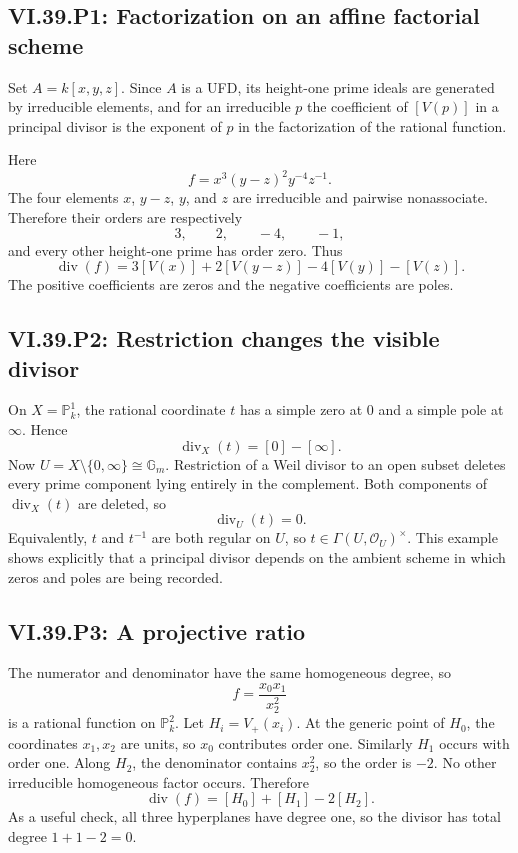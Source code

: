 
\subsection*{VI.39.P1: Factorization on an affine factorial scheme}
\begin{solution}
Set \(A=k[x,y,z]\).  Since \(A\) is a UFD, its height-one prime ideals are generated by irreducible elements, and for an irreducible \(p\) the coefficient of \([V(p)]\) in a principal divisor is the exponent of \(p\) in the factorization of the rational function.

Here
\[
 f=x^3(y-z)^2y^{-4}z^{-1}.
\]
The four elements \(x\), \(y-z\), \(y\), and \(z\) are irreducible and pairwise nonassociate.  Therefore their orders are respectively
\[
 3,\qquad 2,\qquad -4,\qquad -1,
\]
and every other height-one prime has order zero.  Thus
\[
 \boxed{\operatorname{div}(f)
 =3[V(x)]+2[V(y-z)]-4[V(y)]-[V(z)].}
\]
The positive coefficients are zeros and the negative coefficients are poles.
\end{solution}

\subsection*{VI.39.P2: Restriction changes the visible divisor}
\begin{solution}
On \(X=\mathbb P^1_k\), the rational coordinate \(t\) has a simple zero at \(0\) and a simple pole at \(\infty\).  Hence
\[
 \operatorname{div}_X(t)=[0]-[\infty].
\]
Now \(U=X\setminus\{0,\infty\}\cong\mathbb G_m\).  Restriction of a Weil divisor to an open subset deletes every prime component lying entirely in the complement.  Both components of \(\operatorname{div}_X(t)\) are deleted, so
\[
 \boxed{\operatorname{div}_U(t)=0.}
\]
Equivalently, \(t\) and \(t^{-1}\) are both regular on \(U\), so \(t\in\Gamma(U,\mathcal O_U)^\times\).  This example shows explicitly that a principal divisor depends on the ambient scheme in which zeros and poles are being recorded.
\end{solution}

\subsection*{VI.39.P3: A projective ratio}
\begin{solution}
The numerator and denominator have the same homogeneous degree, so
\[
 f=\frac{x_0x_1}{x_2^2}
\]
is a rational function on \(\mathbb P^2_k\).  Let \(H_i=V_+(x_i)\).  At the generic point of \(H_0\), the coordinates \(x_1,x_2\) are units, so \(x_0\) contributes order one.  Similarly \(H_1\) occurs with order one.  Along \(H_2\), the denominator contains \(x_2^2\), so the order is \(-2\).  No other irreducible homogeneous factor occurs.  Therefore
\[
 \boxed{\operatorname{div}(f)=[H_0]+[H_1]-2[H_2].}
\]
As a useful check, all three hyperplanes have degree one, so the divisor has total degree \(1+1-2=0\).
\end{solution}

